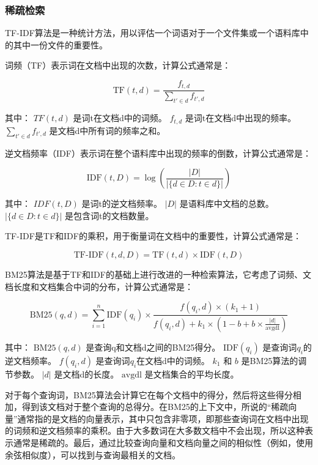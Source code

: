 \subsubsection{稀疏检索}
TF-IDF算法是一种统计方法，用以评估一个词语对于一个文件集或一个语料库中的其中一份文件的重要性。

词频（TF）\cite{KarenSparckJones}表示词在文档中出现的次数，计算公式通常是：

\begin{equation}
\text{TF}(t,d) = \frac{f_{t,d}}{\sum_{t' \in d} f_{t',d}}
\end{equation}

其中： 
$TF(t,d)$ 是词t在文档d中的词频。
$f_{t,d}$ 是词t在文档d中出现的频率。
$\sum_{t' \in d} f_{t',d}$ 是文档d中所有词的频率之和。

逆文档频率（IDF）表示词在整个语料库中出现的频率的倒数，计算公式通常是：

\begin{equation}
\text{IDF}(t,D) = \log\left(\frac{|D|}{|\{d \in D : t \in d\}|}\right)
\end{equation}

其中：
$IDF(t,D)$ 是词t的逆文档频率。
$|D|$ 是语料库中文档的总数。
$|\{d \in D : t \in d\}|$ 是包含词t的文档数量。

TF-IDF是TF和IDF的乘积，用于衡量词在文档中的重要性，计算公式通常是：

\begin{equation}
\text{TF-IDF}(t,d,D) = \text{TF}(t,d) \times \text{IDF}(t,D)
\end{equation}

BM25算法\cite{robertson1995okapi}是基于TF和IDF的基础上进行改进的一种检索算法，它考虑了词频、文档长度和文档集合中词的分布，计算公式通常是：

\begin{equation}
\text{BM25}(q,d) = \sum_{i=1}^{n} \text{IDF}(q_i) \times \frac{f(q_i, d) \times (k_1 + 1)}{f(q_i, d) + k_1 \times (1 - b + b \times \frac{|d|}{\text{avgdl}})}
\end{equation}

其中：
$\text{BM25}(q,d)$ 是查询q和文档d之间的BM25得分。
$\text{IDF}(q_i)$ 是查询词$q_i$的逆文档频率。
$f(q_i, d)$ 是查询词$q_i$在文档d中的词频。
$k_1$ 和 $b$ 是BM25算法的调节参数。
$|d|$ 是文档d的长度。
$\text{avgdl}$ 是文档集合的平均长度。

对于每个查询词，BM25算法会计算它在每个文档中的得分，然后将这些得分相加，得到该文档对于整个查询的总得分。在BM25的上下文中，所说的“稀疏向量”通常指的是文档的向量表示，其中只包含非零项，即那些查询词在文档中出现的词频和逆文档频率的乘积。由于大多数词在大多数文档中不会出现，所以这种表示通常是稀疏的。最后，通过比较查询向量和文档向量之间的相似性（例如，使用余弦相似度），可以找到与查询最相关的文档。

